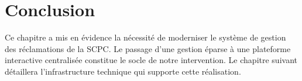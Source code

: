 \section*{Conclusion}
Ce chapitre a mis en évidence la nécessité de moderniser le système de gestion des réclamations de la SCPC. Le passage d'une gestion éparse à une plateforme interactive centralisée constitue le socle de notre intervention. Le chapitre suivant détaillera l'infrastructure technique qui supporte cette réalisation.
